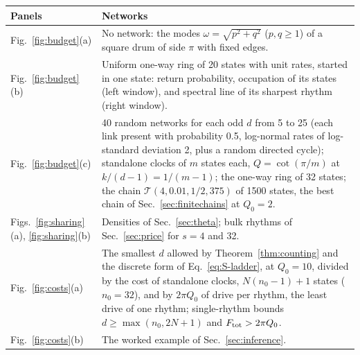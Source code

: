 \medskip
\begin{center}
\renewcommand{\arraystretch}{1.25}
\begin{tabular}{@{}p{}p{}@{}}
\hline\hline
Panels & Networks\\
\hline
Fig.~\ref{fig:budget}(a) & No network: the modes $\omega=\sqrt{p^2+q^2}$ ($p,q\ge1$) of a square drum of side $\pi$ with fixed edges.\\
Fig.~\ref{fig:budget}(b) & Uniform one-way ring of 20 states with unit rates, started in one state: return probability, occupation of its states (left window), and spectral line of its sharpest rhythm (right window).\\
Fig.~\ref{fig:budget}(c) & 40 random networks for each odd $d$ from 5 to 25 (each link present with probability 0.5, log-normal rates of log-standard deviation 2, plus a random directed cycle); standalone clocks of $m$ states each, $Q=\cot(\pi/m)$ at $k/(d-1)=1/(m-1)$; the one-way ring of 32 states; the chain $\mathcal T(4,0.01,1/2,375)$ of 1500 states, the best chain of Sec.~\ref{sec:finitechains} at $Q_0=2$.\\
Figs.~\ref{fig:sharing}(a), \ref{fig:sharing}(b) & Densities of Sec.~\ref{sec:theta}; bulk rhythms of Sec.~\ref{sec:price} for $s=4$ and 32.\\
Fig.~\ref{fig:costs}(a) & The smallest $d$ allowed by Theorem~\ref{thm:counting} and the discrete form of Eq.~\eqref{eq:S-ladder}, at $Q_0=10$, divided by the cost of standalone clocks, $N(n_0-1)+1$ states ($n_0=32$), and by $2\pi Q_0$ of drive per rhythm, the least drive of one rhythm; single-rhythm bounds $d\ge\max(n_0,2N+1)$ and $F_{\mathrm{tot}}>2\pi Q_0$.\\
Fig.~\ref{fig:costs}(b) & The worked example of Sec.~\ref{sec:inference}.\\
\hline\hline
\end{tabular}
\end{center}

